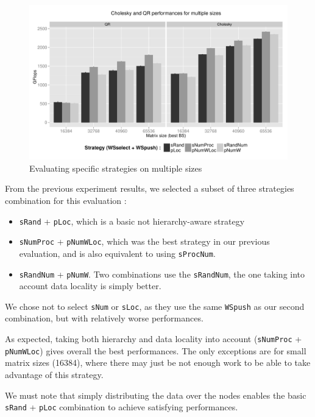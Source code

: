 \documentclass{Styles/llncs}
\begin{document}
\begin{figure}[t]
  \centering
  \includegraphics[scale=0.5]{figures/graph_details_strat.pdf}
\caption{Evaluating specific strategies on multiple sizes}
\label{fig:eval-strat-sizes}
\end{figure}


From the previous experiment results, we selected a subset of three strategies
combination for this evaluation :
\begin{itemize}
  \item \verb/sRand/ + \verb/pLoc/, which is a basic not hierarchy-aware strategy
  \item \verb/sNumProc/ + \verb/pNumWLoc/, which was the best strategy in our previous
    evaluation, and is also equivalent to using \verb/sProcNum/.
  \item \verb/sRandNum/ + \verb/pNumW/. Two combinations use the \verb/sRandNum/,
    the one taking into account data locality is simply better.
\end{itemize}
We chose not to select \verb/sNum/ or \verb/sLoc/, as they use the same \verb/WSpush/
as our second combination, but with relatively worse performances.

As expected, taking both hierarchy and data locality into account (\verb/sNumProc/
+ \verb/pNumWLoc/) gives overall the best performances.
The only exceptions are for small matrix sizes (16384), where there may just be
not enough work to be able to take advantage of this strategy.

We must note that simply distributing the data over the nodes enables the basic
\verb/sRand/ + \verb/pLoc/ combination to achieve satisfying performances.
\end{document}
